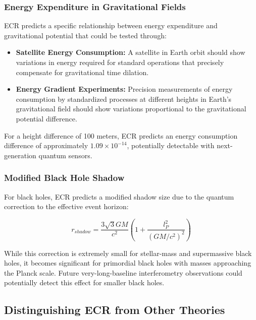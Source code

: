 \documentclass[11pt,a4paper]{article}
\begin{document}
\subsubsection{Energy Expenditure in Gravitational Fields}

ECR predicts a specific relationship between energy expenditure and gravitational potential that could be tested through:

\begin{itemize}
    \item \textbf{Satellite Energy Consumption:} A satellite in Earth orbit should show variations in energy required for standard operations that precisely compensate for gravitational time dilation.
    
    \item \textbf{Energy Gradient Experiments:} Precision measurements of energy consumption by standardized processes at different heights in Earth's gravitational field should show variations proportional to the gravitational potential difference.
\end{itemize}

For a height difference of 100 meters, ECR predicts an energy consumption difference of approximately $1.09 \times 10^{-14}$, potentially detectable with next-generation quantum sensors.

\subsubsection{Modified Black Hole Shadow}

For black holes, ECR predicts a modified shadow size due to the quantum correction to the effective event horizon:

\begin{equation}
    r_{shadow} = \frac{3\sqrt{3}GM}{c^2}\left(1 + \frac{l_P^2}{(GM/c^2)^2}\right)
\end{equation}

While this correction is extremely small for stellar-mass and supermassive black holes, it becomes significant for primordial black holes with masses approaching the Planck scale. Future very-long-baseline interferometry observations could potentially detect this effect for smaller black holes.

\subsection{Distinguishing ECR from Other Theories}
\end{document}
